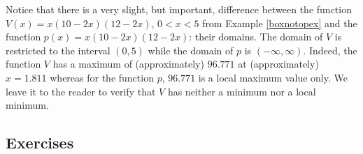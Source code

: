 \documentclass{ximera}
\begin{document}
Notice that there is a very slight, but important, difference between the function $V(x) = x(10-2x)(12-2x)$, $0 < x < 5$ from Example  \ref{boxnotopex} and the function $p(x) = x(10-2x)(12-2x)$: their domains.  The domain of $V$ is restricted to the interval $(0,5)$ while the domain of $p$ is $(-\infty, \infty)$.  Indeed, the function $V$ has a maximum of (approximately) $96.771$ at (approximately) $x = 1.811$ whereas for the function $p$, $96.771$ is a local maximum value only.  We leave it to the reader to verify that $V$ has neither a minimum nor a local minimum.

\newpage

\subsection{Exercises}


\closegraphsfile
\end{document}
